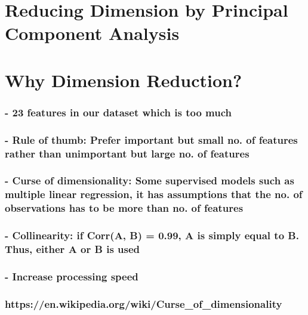 \documentclass[11pt]{article}
\begin{document}
    \section{Reducing Dimension by Principal Component
Analysis}\label{reducing-dimension-by-principal-component-analysis}

    \section{Why Dimension Reduction?}\label{why-dimension-reduction}

\subsubsection{- 23 features in our dataset which is too
much}\label{features-in-our-dataset-which-is-too-much}

\subsubsection{- Rule of thumb: Prefer important but small no. of
features rather than unimportant but large no. of
features}\label{rule-of-thumb-prefer-important-but-small-no.-of-features-rather-than-unimportant-but-large-no.-of-features}

\subsubsection{- Curse of dimensionality: Some supervised models such as
multiple linear regression, it has assumptions that the no. of
observations has to be more than no. of
features}\label{curse-of-dimensionality-some-supervised-models-such-as-multiple-linear-regression-it-has-assumptions-that-the-no.-of-observations-has-to-be-more-than-no.-of-features}

\subsubsection{- Collinearity: if Corr(A, B) = 0.99, A is simply equal
to B. Thus, either A or B is
used}\label{collinearity-if-corra-b-0.99-a-is-simply-equal-to-b.-thus-either-a-or-b-is-used}

\subsubsection{- Increase processing
speed}\label{increase-processing-speed}

\subsubsection{https://en.wikipedia.org/wiki/Curse\_of\_dimensionality}\label{httpsen.wikipedia.orgwikicurse_of_dimensionality}
\end{document}
